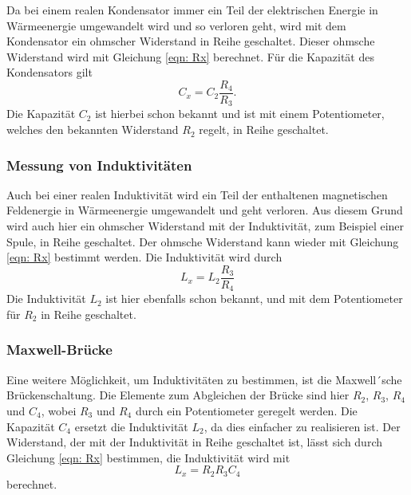         Da bei einem realen Kondensator immer ein Teil der elektrischen Energie in Wärmeenergie umgewandelt
        wird und so verloren geht, wird mit dem Kondensator ein ohmscher Widerstand in Reihe geschaltet.
        Dieser ohmsche Widerstand wird mit Gleichung \eqref{eqn: Rx} berechnet.
        Für die Kapazität des Kondensators gilt
        \begin{equation}
            C_x = C_2 \frac{R_4}{R_3} .
        \end{equation}
        Die Kapazität $C_2$ ist hierbei schon bekannt und ist mit einem Potentiometer, welches den bekannten Widerstand $R_2$ regelt,
        in Reihe geschaltet.

    \subsubsection{Messung von Induktivitäten}

        Auch bei einer realen Induktivität wird ein Teil der enthaltenen magnetischen Feldenergie in Wärmeenergie umgewandelt
        und geht verloren. Aus diesem Grund wird auch hier ein ohmscher Widerstand mit der Induktivität, zum Beispiel einer Spule,
        in Reihe geschaltet.
        Der ohmsche Widerstand kann wieder mit Gleichung \eqref{eqn: Rx} bestimmt werden.
        Die Induktivität wird durch
        \begin{equation}
            L_x = L_2 \frac{R_3}{R_4}
        \end{equation}
        Die Induktivität $L_2$ ist hier ebenfalls schon bekannt, und mit dem Potentiometer für $R_2$ in Reihe geschaltet.

    \subsubsection{Maxwell-Brücke}

        Eine weitere Möglichkeit, um Induktivitäten zu bestimmen, ist die Maxwell´sche Brückenschaltung.
        Die Elemente zum Abgleichen der Brücke sind hier $R_2$, $R_3$, $R_4$ und $C_4$, wobei $R_3$ und $R_4$ durch ein
        Potentiometer geregelt werden. Die Kapazität $C_4$ ersetzt die Induktivität $L_2$, da dies
        einfacher zu realisieren ist.
        Der Widerstand, der mit der Induktivität in Reihe geschaltet ist, lässt sich durch Gleichung \eqref{eqn: Rx} bestimmen,
        die Induktivität wird mit
        \begin{equation}
            L_x = R_2 R_3 C_4
        \end{equation}
        berechnet.

